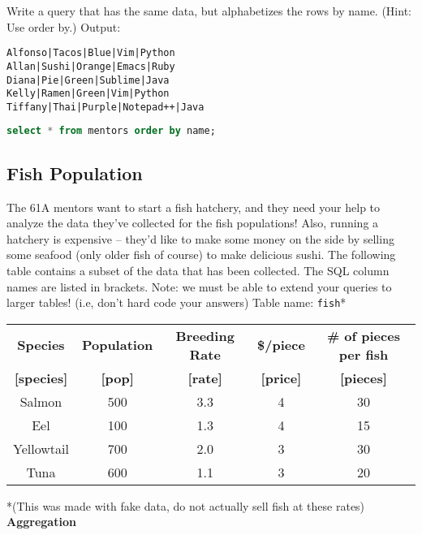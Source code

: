 \documentclass{exam}
\begin{document}
\begin{questions}
\begin{blocksection}
\question Write a query that has the same data, but alphabetizes the rows by name. (Hint: Use order by.) \newline
Output:
\begin{lstlisting}
Alfonso|Tacos|Blue|Vim|Python
Allan|Sushi|Orange|Emacs|Ruby
Diana|Pie|Green|Sublime|Java
Kelly|Ramen|Green|Vim|Python
Tiffany|Thai|Purple|Notepad++|Java
\end{lstlisting}
\begin{solution}[1in]
\begin{lstlisting}[language=SQL]
select * from mentors order by name;
\end{lstlisting}
\end{solution}
\end{blocksection}


\begin{blocksection}
\section{Fish Population}
The 61A mentors want to start a fish hatchery, and they need your help to analyze the data they've collected for the fish populations! Also, running a hatchery is expensive -- they'd like to make some money on the side by selling some seafood (only older fish of course) to make delicious sushi. \newline
\newline
The following table contains a subset of the data that has been collected. The SQL column names are listed in brackets. Note: we must be able to extend your queries to larger tables! (i.e, don't hard code your answers) \newline
\newline
Table name: \texttt{fish}*
\begin{center}
\begin{tabular}{ |c|c|c|c|c| }
 \hline
 \textbf{Species} & \textbf{Population} & \textbf{Breeding Rate} & \textbf{\$/piece} & \textbf{\# of pieces per fish} \\
  \textbf{[species]} & \textbf{[pop]} & \textbf{[rate]} & \textbf{[price]} & \textbf{[pieces]} \\
 \hline
 Salmon & 500 & 3.3 & 4 & 30 \\
 \hline
 Eel & 100 & 1.3 & 4 & 15 \\
 \hline
  Yellowtail & 700 & 2.0 & 3 & 30 \\
 \hline
 Tuna & 600 & 1.1 & 3 & 20 \\
 \hline
\end{tabular}
\end{center}
*(This was made with fake data, do not actually sell fish at these rates)
\question \textbf{Aggregation}
\begin{parts}

\end{parts}
\end{blocksection}
\end{questions}
\end{document}
